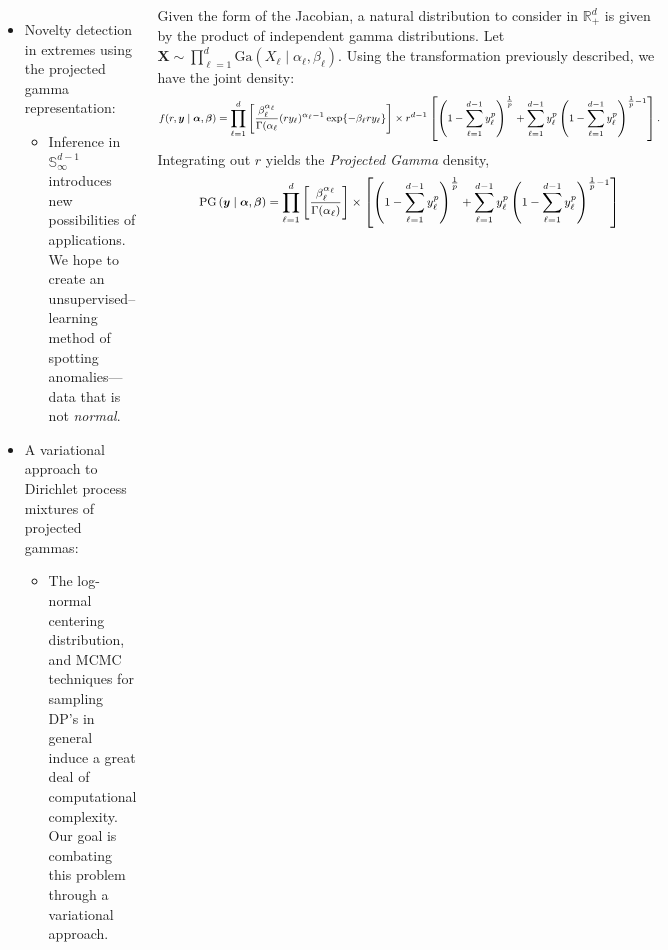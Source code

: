 \documentclass[20pt, a0paper, landscape,colspace=0.8cm,blockverticalspace=0.8cm,innermargin=0.8cm]{tikzposter}
\begin{document}
\begin{columns}
    
    {
    \begin{itemize}[noitemsep,nolistsep]
        \item Novelty detection in extremes using the projected gamma representation:
            \begin{itemize}[noitemsep,nolistsep]
                \item Inference in $\mathbb{S}_{\infty}^{d-1}$ introduces new possibilities of applications.  We hope to create an unsupervised--learning method of spotting anomalies---data that is not \emph{normal}.
            \end{itemize}
        \item A variational approach to Dirichlet process mixtures of projected gammas:
        \begin{itemize}[noitemsep,nolistsep]
            \item The log-normal centering distribution, and MCMC techniques for sampling DP's in general induce a great deal of computational complexity.  Our goal is combating this problem through a variational approach.
        \end{itemize}
    \end{itemize}
    }
    {
    Given the form of the Jacobian, a natural distribution to consider in $\mathbb{R}_+^d$ is given by the product of 
    independent gamma distributions.  Let $\bm{X} \sim \prod_{\ell = 1}^d\text{Ga}(X_{\ell}\mid\alpha_{\ell},\beta_{\ell})$.  
    Using the transformation previously described, we have the joint density:
    \[
        \medmath{
        f(r,\bm{y}\mid\bm{\alpha},\bm{\beta}) = \prod_{\ell = 1}^d \left[ \frac{\beta_{\ell}^{\alpha_{\ell}}}{\Gamma(\alpha_{\ell}}
            (ry_{\ell})^{\alpha_{\ell} - 1}\exp\lbrace-\beta_{\ell}ry_{\ell}\rbrace\right]\times 
            r^{d-1}\left[\left(1 - \sum_{\ell = 1}^{d-1}y_{\ell}^p\right)^{\frac{1}{p}} +
            \sum_{\ell = 1}^{d-1}y_{\ell}^p\left(1 - \sum_{\ell = 1}^{d-1}y_{\ell}^p\right)^{\frac{1}{p} - 1}\right].
            }
    \]
    Integrating out $r$ yields the \emph{Projected Gamma} density,
    \[
        \medmath{
    \text{PG}\left(\bm{y}\mid\bm{\alpha},\bm{\beta}\right) = \prod_{\ell = 1}^d
        \left[\frac{\beta_{\ell}^{\alpha_{\ell}}}{\Gamma(\alpha_{\ell})}\right]
        \times \left[\left(1 - \sum_{\ell = 1}^{d-1}y_{\ell}^p\right)^{\frac{1}{p}} +
            \sum_{\ell = 1}^{d-1}y_{\ell}^p\left(1 - \sum_{\ell = 1}^{d-1}y_{\ell}^p\right)^{\frac{1}{p} - 1}\right]
}\]}
\end{columns}
\end{document}
